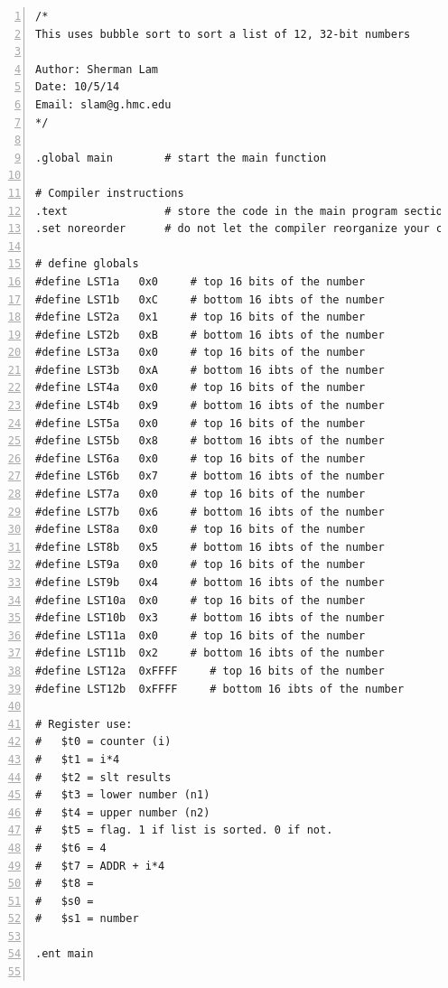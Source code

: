 \documentclass[11pt]{article}
\begin{document}
\begin{lstlisting}[numbers=left,basicstyle=\footnotesize]
/*
This uses bubble sort to sort a list of 12, 32-bit numbers

Author: Sherman Lam
Date: 10/5/14
Email: slam@g.hmc.edu
*/

.global main        # start the main function

# Compiler instructions
.text               # store the code in the main program section of RAM
.set noreorder      # do not let the compiler reorganize your code

# define globals
#define LST1a   0x0     # top 16 bits of the number
#define LST1b   0xC     # bottom 16 ibts of the number
#define LST2a   0x1     # top 16 bits of the number
#define LST2b   0xB     # bottom 16 ibts of the number
#define LST3a   0x0     # top 16 bits of the number
#define LST3b   0xA     # bottom 16 ibts of the number
#define LST4a   0x0     # top 16 bits of the number
#define LST4b   0x9     # bottom 16 ibts of the number
#define LST5a   0x0     # top 16 bits of the number
#define LST5b   0x8     # bottom 16 ibts of the number
#define LST6a   0x0     # top 16 bits of the number
#define LST6b   0x7     # bottom 16 ibts of the number
#define LST7a   0x0     # top 16 bits of the number
#define LST7b   0x6     # bottom 16 ibts of the number
#define LST8a   0x0     # top 16 bits of the number
#define LST8b   0x5     # bottom 16 ibts of the number
#define LST9a   0x0     # top 16 bits of the number
#define LST9b   0x4     # bottom 16 ibts of the number
#define LST10a  0x0     # top 16 bits of the number
#define LST10b  0x3     # bottom 16 ibts of the number
#define LST11a  0x0     # top 16 bits of the number
#define LST11b  0x2     # bottom 16 ibts of the number
#define LST12a  0xFFFF     # top 16 bits of the number
#define LST12b  0xFFFF     # bottom 16 ibts of the number

# Register use:
#   $t0 = counter (i)
#   $t1 = i*4
#   $t2 = slt results
#   $t3 = lower number (n1)
#   $t4 = upper number (n2)
#   $t5 = flag. 1 if list is sorted. 0 if not.
#   $t6 = 4
#   $t7 = ADDR + i*4
#   $t8 = 
#   $s0 = 
#   $s1 = number

.ent main


\end{lstlisting}
\end{document}
